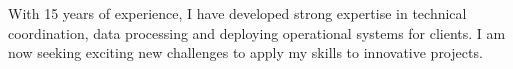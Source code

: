 \documentclass[10pt,a4paper,ragged2e,withhyper]{altacv}
\begin{document}

\makecvheader

\divider

With 15 years of experience, I have developed strong expertise in technical coordination, data processing and deploying operational systems for clients. I am now seeking exciting new challenges to apply my skills to innovative projects.


\end{document}
